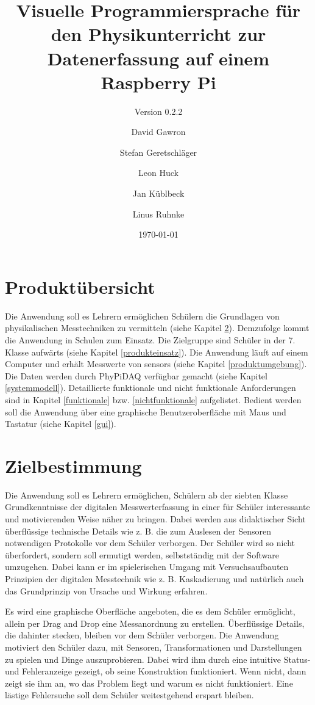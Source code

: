 \documentclass[parskip=full]{scrartcl}
\title{Visuelle Programmiersprache für den Physikunterricht zur Datenerfassung auf einem Raspberry Pi}
\subtitle{Version 0.2.2}
\author{David Gawron \and Stefan Geretschläger \and Leon Huck \and Jan Küblbeck \and Linus Ruhnke}
\date{\today}
\begin{document}
\maketitle

\newpage
\tableofcontents 					%
\newpage

\section{Produktübersicht} %

Die Anwendung soll es Lehrern ermöglichen Schülern die Grundlagen von physikalischen Messtechniken zu vermitteln (siehe Kapitel \ref{zielbestimmung}).
Demzufolge kommt die Anwendung in Schulen zum Einsatz. Die Zielgruppe sind Schüler in der 7. Klasse aufwärts (siehe Kapitel \ref{produkteinsatz}).
Die Anwendung läuft auf einem Computer und erhält Messwerte von \glspl{sensor} (siehe Kapitel \ref{produktumgebung}). Die Daten werden durch \gls{PhyPiDAQ} verfügbar gemacht (siehe Kapitel \ref{systemmodell}).
Detaillierte funktionale und nicht funktionale Anforderungen sind in Kapitel \ref{funktionale} bzw. \ref{nichtfunktionale} aufgelistet.
Bedient werden soll die Anwendung über eine graphische Benutzeroberfläche mit Maus und Tastatur (siehe Kapitel \ref{gui}).

\section{Zielbestimmung}\label{zielbestimmung}

Die Anwendung soll es Lehrern ermöglichen, Schülern ab der siebten Klasse Grundkenntnisse der digitalen Messwerterfassung in einer für Schüler interessante und motivierenden Weise näher zu bringen. 
Dabei werden aus didaktischer Sicht überflüssige technische Details wie z. B. die zum Auslesen der Sensoren notwendigen Protokolle vor dem Schüler verborgen.
Der Schüler wird so nicht überfordert, sondern soll ermutigt werden, selbstständig mit der Software umzugehen. 
Dabei kann er im spielerischen Umgang mit Versuchsaufbauten Prinzipien der digitalen Messtechnik wie z. B. Kaskadierung und natürlich auch das Grundprinzip von Ursache und Wirkung erfahren.

Es wird eine graphische Oberfläche angeboten, die es dem Schüler ermöglicht, allein per Drag and Drop eine Messanordnung zu erstellen. 
Überflüssige Details, die dahinter stecken, bleiben vor dem Schüler verborgen.
Die Anwendung motiviert den Schüler dazu, mit Sensoren, Transformationen und Darstellungen zu spielen und Dinge auszuprobieren. 
Dabei wird ihm durch eine intuitive Status- und Fehleranzeige gezeigt, ob seine Konstruktion funktioniert. 
Wenn nicht, dann zeigt sie ihm an, wo das Problem liegt und warum es nicht funktioniert. 
Eine lästige Fehlersuche soll dem Schüler weitestgehend erspart bleiben. 
\end{document}
